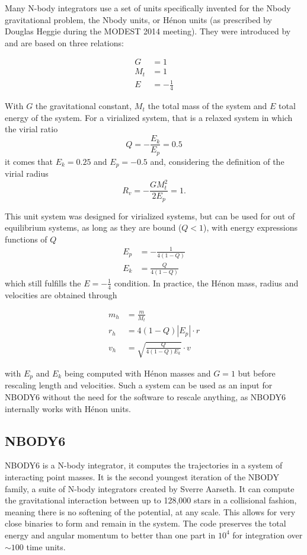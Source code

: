 Many N-body integrators use a set of units specifically invented for the Nbody gravitational problem, the Nbody units, or H\'enon units (as prescribed by Douglas Heggie during the MODEST 2014 meeting). They were introduced by \cite{Henon1971} and are based on three relations:

\begin{align}
G &= 1\\
M_t &= 1\\
E &= -\frac{1}{4}
\end{align}

With $G$ the gravitational constant, $M_t$ the total mass of the system and $E$ total energy of the system. For a virialized system, that is a relaxed system in which the virial ratio 
\begin{equation}
Q = - \frac{E_k}{E_p} = 0.5
\end{equation}
it comes that $E_k=0.25$ and $E_p = -0.5$ and, considering the definition of the virial radius 
\begin{equation}
R_v = - \frac{G M_t^2}{2 E_p} = 1.
\end{equation} 

This unit system was designed for virialized systems, but can be used for out of equilibrium systems, as long as they are bound ($Q <1$), with energy expressions functions of $Q$
\begin{align}
E_p  &= - \frac{1}{4(1-Q)}\\
E_k &= \frac{Q}{4(1-Q)}
\end{align}
which still fulfills the $E = -\frac{1}{4}$ condition. In practice, the H\'enon mass, radius and velocities are obtained through

\begin{align}
m_h &= \frac{m}{M_t}\\
r_h &= 4 (1-Q) |E_p| \cdot r\\
v_h &= \sqrt{ \frac{Q}{4(1-Q) E_k} } \cdot v
\end{align}

with $E_p$ and $E_k$ being computed with H\'enon masses and $G=1$ but before rescaling length and velocities. Such a system can be used as an input for NBODY6 without the need for the software to rescale anything, as NBODY6 internally works with H\'enon units.


\subsection{NBODY6}


NBODY6 is a N-body integrator, it computes the trajectories in a system of interacting point masses. It is the second youngest iteration of the NBODY family, a suite of N-body integrators created by Sverre Aarseth. It can compute the gravitational interaction between up to 128,000 stars in a collisional fashion, meaning there is no softening of the potential, at any scale. This allows for very close binaries to form and remain in the system. The code preserves the total energy and angular momentum to better than one part in $10^4$ for integration over $\sim 100 $ time units.

